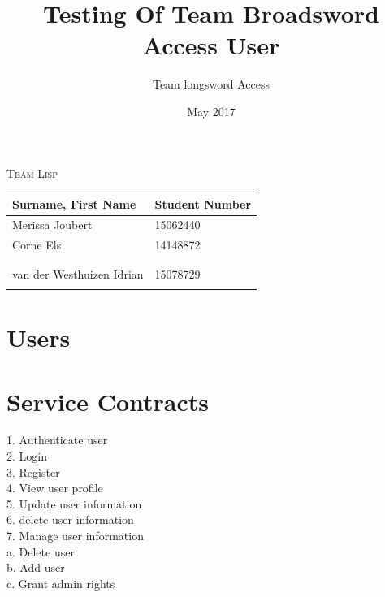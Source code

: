 \documentclass[english]{article}
\begin{document}
\title{Testing Of Team Broadsword Access User }
\author{Team longsword Access }
\date{May 2017}
\maketitle
\begin{center}
{\scshape\Large Team Lisp \par}
\vspace{0.9cm}
	\begin{tabu} to \textwidth { X[l] X[l]}
		\hline
		\textbf{Surname, First Name  }	& \textbf{Student Number}	\\ \hline \hline
		   Merissa Joubert &15062440	\\ \hline
		  Corne Els &14148872	\\ \hline
		  &	\\ \hline
	    	 &	\\ \hline
		van der Westhuizen Idrian&15078729\\ \hline
		 &	\\ \hline
		\hline
	\end{tabu}
	
	\end{center}

	\newpage
	\tableofcontents

	\newpage

\section{Users}

\section{Service Contracts}
1.	Authenticate user\\
2.	Login\\
3.	Register\\
4.	View user profile\\
5.	Update user information\\
6.	delete user information\\
7.	Manage user information\\
    a.	Delete user\\
    b.	Add user\\
    c.	Grant admin rights\\
\end{document}
